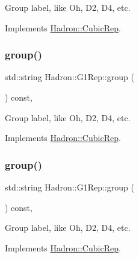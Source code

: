 Group label, like Oh, D2, D4, etc. 

Implements \mbox{\hyperlink{structHadron_1_1CubicRep_a0748f11ec87f387062c8e8981339a29c}{Hadron\+::\+Cubic\+Rep}}.

\mbox{\label{structHadron_1_1G1Rep_a46fbef350073111e5d5d23ae1dc9832d}} 
\subsubsection{\texorpdfstring{group()}{group()}\hspace{0.1cm}{\footnotesize\ttfamily [2/3]}}
{\footnotesize\ttfamily std\+::string Hadron\+::\+G1\+Rep\+::group (\begin{DoxyParamCaption}{ }\end{DoxyParamCaption}) const\hspace{0.3cm}{\ttfamily [inline]}, {\ttfamily [virtual]}}

Group label, like Oh, D2, D4, etc. 

Implements \mbox{\hyperlink{structHadron_1_1CubicRep_a0748f11ec87f387062c8e8981339a29c}{Hadron\+::\+Cubic\+Rep}}.

\mbox{\label{structHadron_1_1G1Rep_a46fbef350073111e5d5d23ae1dc9832d}} 
\subsubsection{\texorpdfstring{group()}{group()}\hspace{0.1cm}{\footnotesize\ttfamily [3/3]}}
{\footnotesize\ttfamily std\+::string Hadron\+::\+G1\+Rep\+::group (\begin{DoxyParamCaption}{ }\end{DoxyParamCaption}) const\hspace{0.3cm}{\ttfamily [inline]}, {\ttfamily [virtual]}}

Group label, like Oh, D2, D4, etc. 

Implements \mbox{\hyperlink{structHadron_1_1CubicRep_a0748f11ec87f387062c8e8981339a29c}{Hadron\+::\+Cubic\+Rep}}.

\mbox{\label{structHadron_1_1G1Rep_a2da49f8741322aebd7903da15cb9b751}} 
